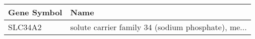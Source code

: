 \begin{tabular}{ll}
\toprule
Gene Symbol &                                               Name \\
\midrule
    SLC34A2 & solute carrier family 34 (sodium phosphate), me... \\
\bottomrule
\end{tabular}
